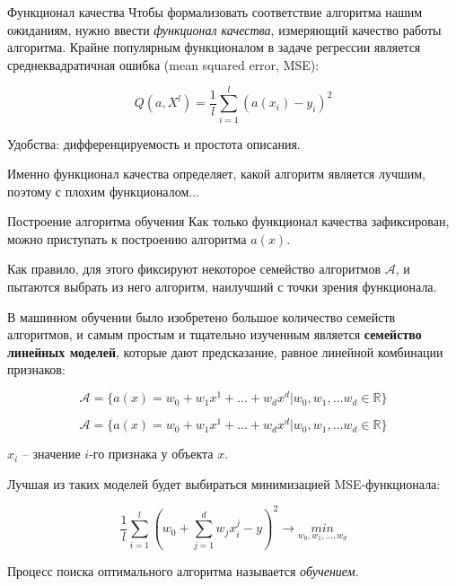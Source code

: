 \documentclass[pdf, intlimits, 9pt, unicode]{beamer}
\begin{document}
\begin{frame}{Функционал качества}
Чтобы формализовать соответствие алгоритма нашим ожиданиям, нужно ввести \emph{функционал качества}, измеряющий качество работы алгоритма. Крайне популярным функционалом в задаче регрессии является среднеквадратичная ошибка (mean squared error, MSE):

$$Q (a, X^l) = \frac{1}{l} \sum_{i=1}^{l}{(a(x_i) - y_i)^2}$$\pause

Удобства: дифференцируемость и простота описания.

Именно функционал качества определяет, какой алгоритм является лучшим, поэтому с плохим функционалом...
\end{frame}






\begin{frame}{Построение алгоритма обучения}
Как только функционал качества зафиксирован, можно приступать к построению алгоритма $a(x)$.\pause

Как правило, для этого фиксируют некоторое семейство алгоритмов $\mathcal{A}$, и пытаются выбрать из него алгоритм, наилучший с точки зрения функционала.\pause

В машинном обучении было изобретено большое количество семейств
алгоритмов, и самым простым и тщательно изученным является \textbf{семейство линейных моделей}, которые дают предсказание, равное линейной комбинации признаков:

$$\mathcal{A} = \{ a(x) = w_0 + w_1 x^1 + \dots + w_d x^d | w_0, w_1, \dots w_d \in \mathbb{R} \}$$

\end{frame}





\begin{frame}

$$\mathcal{A} = \{ a(x) = w_0 + w_1 x^1 + \dots + w_d x^d | w_0, w_1, \dots w_d \in \mathbb{R} \}$$

$x_i$ -- значение $i$-го признака у объекта $x$.\pause

Лучшая из таких моделей будет выбираться минимизацией MSE-функционала:

$$\frac{1}{l} \sum_{i=1}^{l}{ \left ( w_0 + \sum_{j=1}^{d}{w_j x_i^j - y} \right )^2 } \rightarrow \underset{w_0, w_1, \dots, w_d}{min} $$\pause

Процесс поиска оптимального алгоритма называется \emph{обучением}.

\end{frame}
\end{document}
